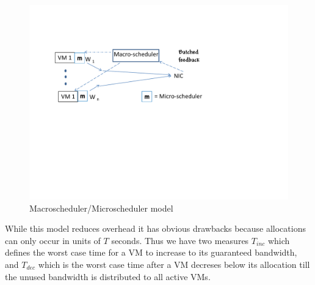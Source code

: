 \begin{figure}
\centering
\includegraphics[width=\columnwidth, trim=6mm 90mm 20mm 10mm]{figures/macroschedule}
\caption{Macroscheduler/Microscheduler model}
\label{fig:macroscheduler}
\vspace{-3mm}
\end{figure}

While this model reduces overhead it has obvious drawbacks because allocations
can only occur in units of $T$ seconds.   Thus we have two measures $T_{inc}$
which defines the worst case time for a VM to increase to its guaranteed
bandwidth, and $T_{dec}$ which is the worst case time after a VM decreses below
its allocation till the unused bandwidth is distributed to all active VMs. 
